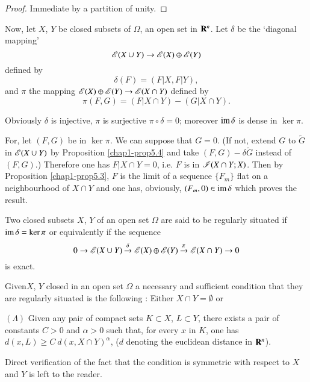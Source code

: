 \begin{proof}
Immediate by a partition of unity.
\end{proof}

Now, let $X$, $Y$ be closed subsets of $\Omega$, an open set in $\mathbf{R}^{n}$. Let $\delta$ be the `diagonal mapping'
$$
\mathscr{E}(X\cup Y)\to \mathscr{E}(X)\oplus \mathscr{E}(Y)
$$
defined by
$$
\delta(F)=(F|X,F|Y),
$$
and $\pi$ the mapping $\mathscr{E}(X)\oplus \mathscr{E}(Y)\to \mathscr{E}(X\cap Y)$ defined by
$$
\pi(F,G)=(F|X\cap Y)-(G|X\cap Y).
$$

Obviously $\delta$ is injective, $\pi$ is surjective $\pi\circ \delta=0$; moreover $\operatorname{im} \delta$ is dense in $\ker \pi$.

For, let $(F,G)$ be in $\ker \pi$. We can suppose that $G=0$. (If not, extend $G$ to $\widetilde{G}$ in $\mathscr{E}(X\cup Y)$ by Proposition \ref{chap1-prop5.4} and take $(F,G)-\delta\widetilde{G}$ instead of $(F,G)$.) Therefore one has $F|X\cap Y=0$, i.e. $F$ is in $\mathscr{I}(X\cap Y;X)$. Then by Proposition \ref{chap1-prop5.3}, $F$ is the limit of a sequence $\{F_{m}\}$ flat on a neighbourhood of $X\cap Y$ and one has, obviously, $(F_{m},0)\in \operatorname{im} \delta$ which proves the result.

\begin{definition}\label{chap1-defi5.4}
Two closed subsets $X$, $Y$ of an open set $\Omega$ are said to be regularly situated if $\operatorname{im} \delta=\ker \pi$ or equivalently if the sequence
$$
0\to \mathscr{E}(X\cup Y)\xrightarrow{\delta}\mathscr{E}(X)\oplus \mathscr{E}(Y)\xrightarrow{\pi}\mathscr{E}(X\cap Y)\to 0
$$
is exact.
\end{definition}

\begin{theorem}\label{chap1-thm5.5}
Given\pageoriginale $X$, $Y$ closed in an open set $\Omega$ a necessary and sufficient condition that they are regularly situated is the following : Either $X\cap Y=\emptyset$ or

$(\Lambda)$ Given any pair of compact sets $K\subset X$, $L\subset Y$, there exists a pair of constants $C>0$ and $\alpha>0$ such that, for every $x$ in $K$, one has $d(x,L)\geq C \ d(x,X\cap Y)^{\alpha}$, ($d$ denoting the euclidean distance in $\mathbf{R}^{n}$).
\end{theorem}

Direct verification of the fact that the condition is symmetric with respect to $X$ and $Y$ is left to the reader.


